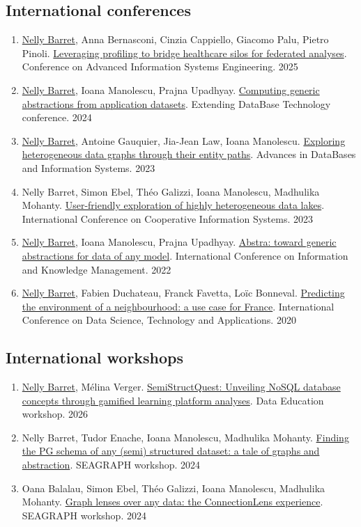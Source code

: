 \documentclass{article}
\begin{document}
\subsection*{International conferences}
\begin{enumerate}[resume]
\item \underline{Nelly Barret}, Anna Bernasconi, Cinzia Cappiello, Giacomo Palu, Pietro Pinoli. \href{https://www.researchgate.net/publication/392478298_Leveraging_Profiling_to_Bridge_Healthcare_Silos_for_Federated_Analyses}{Leveraging profiling to bridge healthcare silos for federated analyses}. Conference on Advanced Information Systems Engineering. 2025
\item \underline{Nelly Barret}, Ioana Manolescu, Prajna Upadhyay. \href{https://openproceedings.org/2024/conf/edbt/paper-31.pdf}{Computing generic abstractions from application datasets}. Extending DataBase Technology conference. 2024
\item \underline{Nelly Barret}, Antoine Gauquier, Jia-Jean Law, Ioana Manolescu. \href{https://hal.science/hal-04131977}{Exploring heterogeneous data graphs through their entity paths}. Advances in DataBases and Information Systems. 2023
\item Nelly Barret, Simon Ebel, Théo Galizzi, Ioana Manolescu, Madhulika Mohanty. \href{https://hal.science/hal-04185938}{User-friendly exploration of highly heterogeneous data lakes}. International Conference on Cooperative Information Systems. 2023
\item \underline{Nelly Barret}, Ioana Manolescu, Prajna Upadhyay. \href{https://dl.acm.org/doi/10.1145/3511808.3557179}{Abstra: toward generic abstractions for data of any model}. International Conference on Information and Knowledge Management. 2022
\item \underline{Nelly Barret}, Fabien Duchateau, Franck Favetta, Loïc Bonneval. \href{https://www.scitepress.org/PublicationsDetail.aspx?ID=YRZoV7ChM6U=&t=1}{Predicting the environment of a neighbourhood: a use case for France}. International Conference on Data Science, Technology and Applications. 2020
\end{enumerate}
\subsection*{International workshops}
\begin{enumerate}[resume]
\item \underline{Nelly Barret}, Mélina Verger. \href{https://hal.science/hal-05579539}{SemiStructQuest: Unveiling NoSQL database concepts through gamified learning platform analyses}. Data Education workshop. 2026
\item Nelly Barret, Tudor Enache, Ioana Manolescu, Madhulika Mohanty. \href{https://inria.hal.science/hal-04591933}{Finding the PG schema of any (semi) structured dataset: a tale of graphs and abstraction}. SEAGRAPH workshop. 2024
\item Oana Balalau, Simon Ebel, Théo Galizzi, Ioana Manolescu, Madhulika Mohanty. \href{https://inria.hal.science/hal-04591897}{Graph lenses over any data: the ConnectionLens experience}. SEAGRAPH workshop. 2024
\end{enumerate}
\end{document}
